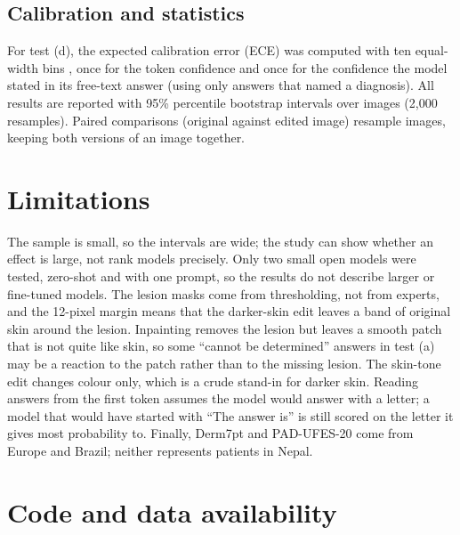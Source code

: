 \documentclass[11pt,a4paper]{article}
\newif\ifresults
\begin{document}
\subsection{Calibration and statistics}

For test (d), the expected calibration error (ECE) was computed with ten equal-width bins \cite{guo2017}, once for the token confidence and once for the confidence the model stated in its free-text answer (using only answers that named a diagnosis). All results are reported with 95\% percentile bootstrap intervals over images (2,000 resamples). Paired comparisons (original against edited image) resample images, keeping both versions of an image together.

\ifresults
\section{Results}


\section{Discussion}

\fi

\section{Limitations}

The sample is small, so the intervals are wide; the study can show whether an effect is large, not rank models precisely. Only two small open models were tested, zero-shot and with one prompt, so the results do not describe larger or fine-tuned models. The lesion masks come from thresholding, not from experts, and the 12-pixel margin means that the darker-skin edit leaves a band of original skin around the lesion. Inpainting removes the lesion but leaves a smooth patch that is not quite like skin, so some ``cannot be determined'' answers in test (a) may be a reaction to the patch rather than to the missing lesion. The skin-tone edit changes colour only, which is a crude stand-in for darker skin. Reading answers from the first token assumes the model would answer with a letter; a model that would have started with ``The answer is'' is still scored on the letter it gives most probability to. Finally, Derm7pt and PAD-UFES-20 come from Europe and Brazil; neither represents patients in Nepal.

\section*{Code and data availability}
\end{document}
